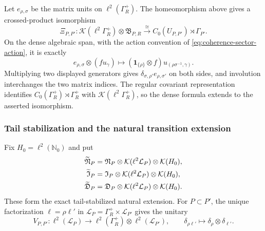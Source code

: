Let $e_{\rho,\sigma}$ be the matrix units on
$\ell^2(\Gamma_R^+)$.  The homeomorphism above gives a crossed-product
isomorphism
\begin{equation}
 \Xi_{P,P'}:
 \mathcal K(\ell^2\Gamma_R^+)\otimes\mathfrak B_{P,R}
 \xrightarrow{\ \cong\ }
 C_0(U_{P,P'})\rtimes\Gamma_{P'}.
 \label{eq:coherence-sector-crossed-product-isomorphism}
\end{equation}
On the dense algebraic span, with the action convention of
\eqref{eq:coherence-sector-action}, it is exactly
\begin{equation}
 e_{\rho,\sigma}\otimes(fu_\gamma)
 \longmapsto
 (\mathbf1_{\{\rho\}}\otimes f)
 u_{(\rho\sigma^{-1},\gamma)}.
 \label{eq:coherence-sector-matrix-units}
\end{equation}
Multiplying two displayed generators gives
$\delta_{\sigma,\rho'}e_{\rho,\sigma'}$ on both sides, and involution
interchanges the two matrix indices.  The regular covariant representation
identifies $C_0(\Gamma_R^+)\rtimes\Gamma_R^+$ with
$\mathcal K(\ell^2\Gamma_R^+)$, so the dense formula extends to the asserted
isomorphism.

\subsubsection{Tail stabilization and the natural transition extension}

Fix $H_0=\ell^2(\mathbb N_0)$ and put
\begin{align}
 \widetilde{\mathfrak N}_P
 &=\mathfrak N_P\otimes\mathcal K(\ell^2\mathcal L_P)
                  \otimes\mathcal K(H_0),\notag\\
 \widetilde{\mathfrak I}_P
 &=\mathfrak I_P\otimes\mathcal K(\ell^2\mathcal L_P)
                  \otimes\mathcal K(H_0),\notag\\
 \widetilde{\mathfrak D}_P
 &=\mathfrak D_P\otimes\mathcal K(\ell^2\mathcal L_P)
                  \otimes\mathcal K(H_0).
 \label{eq:coherence-tail-stabilized-natural-algebras}
\end{align}
These form the exact tail-stabilized natural extension.  For
$P\subset P'$, the unique factorization
$\ell=\rho\ell'$ in
$\mathcal L_P=\Gamma_R^+\times\mathcal L_{P'}$ gives the unitary
\begin{equation}
 V_{P,P'}:\ell^2(\mathcal L_P)\longrightarrow
 \ell^2(\Gamma_R^+)\otimes\ell^2(\mathcal L_{P'}),
 \qquad \delta_{\rho\ell'}\longmapsto\delta_\rho\otimes\delta_{\ell'}.
 \label{eq:coherence-tail-unitary}
\end{equation}

